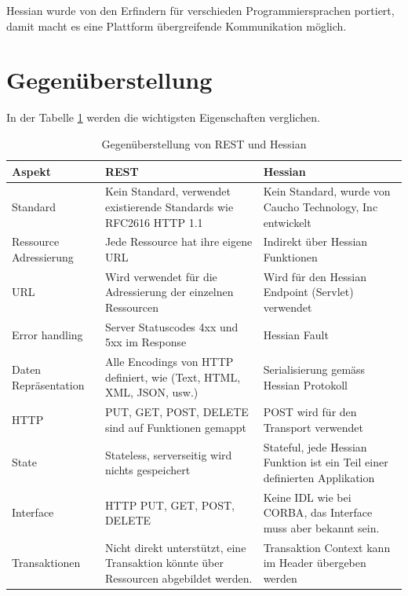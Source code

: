 \documentclass[abstracton, listof=totocnumbered,
bibliography=totocnumbered]{scrreprt}
\begin{document}
  Hessian wurde von den Erfindern für verschieden Programmiersprachen portiert,
  damit macht es eine Plattform übergreifende Kommunikation möglich.
  
  \enlargethispage{3cm}
  
  \section{Gegenüberstellung}
  
  In der Tabelle \ref{tab:gegenueberstellungRestHessian} werden die wichtigsten
  Eigenschaften verglichen.
  \newline
  
  \begin{table}[h]
    \begin{center}
      \begin{tabular}{p{2.4cm}p{6.1cm}p{6.1cm}}
        \toprule
        Aspekt & REST & Hessian \\
        \midrule
        \nohyphens{Standard} & Kein Standard, verwendet existierende Standards wie
        RFC2616 HTTP 1.1 & Kein Standard, wurde von Caucho Technology, Inc entwickelt\\
        \cmidrule{2-3}
        \nohyphens{Ressource Adressierung} & Jede Ressource hat ihre eigene \ac{URL}
        & Indirekt über Hessian Funktionen\\
        \cmidrule{2-3}
        \nohyphens{URL} & Wird verwendet für die Adressierung der einzelnen
        Ressourcen & Wird für den Hessian Endpoint (Servlet) verwendet\\
        \cmidrule{2-3}
        \nohyphens{Error handling} & Server Statuscodes 4xx und 5xx im Response &
        Hessian Fault\\
        \cmidrule{2-3}
        \nohyphens{Daten Repräsentation} & Alle Encodings von \ac{HTTP} definiert,
        wie (Text, \ac{HTML}, \ac{XML}, \ac{JSON}, usw.) & Serialisierung
        gemäss Hessian Protokoll\\
        \cmidrule{2-3}
        \nohyphens{HTTP} & PUT, GET, POST, DELETE sind auf Funktionen gemappt & POST
        wird für den Transport verwendet\\
        \cmidrule{2-3}
        \nohyphens{State} & Stateless, serverseitig wird nichts gespeichert &
        Stateful, jede Hessian Funktion ist ein Teil einer definierten Applikation\\
        \cmidrule{2-3}
        \nohyphens{Interface} & \ac{HTTP} PUT, GET, POST, DELETE & Keine \ac{IDL}
        wie bei \ac{CORBA}, das Interface muss aber bekannt sein.\\
        \cmidrule{2-3}
        \nohyphens{Transaktionen} & Nicht direkt unterstützt, eine Transaktion
        könnte über Ressourcen abgebildet werden. & Transaktion Context kann im Header übergeben
        werden\\
        \bottomrule
      \end{tabular}
      \caption{Gegenüberstellung von REST und Hessian}
      \label{tab:gegenueberstellungRestHessian}
    \end{center}
  \end{table}
  
\end{document}
